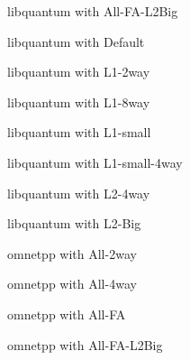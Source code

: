\documentclass[cacheSimReport.tex]{subfiles}
\begin{document}
\pagebreak
\begin{center}
{\Large{libquantum with All-FA-L2Big}}
\end{center}

\pagebreak
\begin{center}
{\Large{libquantum with Default}}
\end{center}

\pagebreak
\begin{center}
{\Large{libquantum with L1-2way}}
\end{center}

\pagebreak
\begin{center}
{\Large{libquantum with L1-8way}}
\end{center}

\pagebreak
\begin{center}
{\Large{libquantum with L1-small}}
\end{center}

\pagebreak
\begin{center}
{\Large{libquantum with L1-small-4way}}
\end{center}

\pagebreak
\begin{center}
{\Large{libquantum with L2-4way}}
\end{center}

\pagebreak
\begin{center}
{\Large{libquantum with L2-Big}}
\end{center}

\pagebreak
\begin{center}
{\Large{omnetpp with All-2way}}
\end{center}

\pagebreak
\begin{center}
{\Large{omnetpp with All-4way}}
\end{center}

\pagebreak
\begin{center}
{\Large{omnetpp with All-FA}}
\end{center}

\pagebreak
\begin{center}
{\Large{omnetpp with All-FA-L2Big}}
\end{center}

\end{document}
